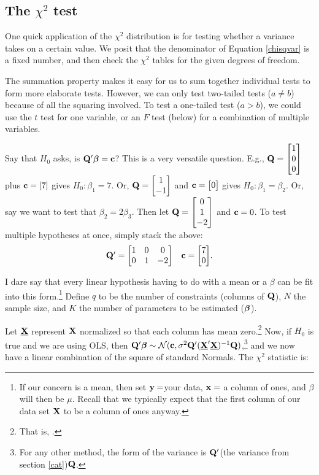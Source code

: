 


\subsection{The $\chi^2$ test}
One quick application of the $\chi^2$ distribution is for testing
whether a variance takes on a certain value. We posit that the
denominator of Equation \ref{chisqvar} is a fixed number, and then check
the $\chi^2$ tables for the given degrees of freedom.

The summation property makes it easy for us to sum together individual
tests to form more elaborate tests. However, we can only test two-tailed
tests ($a \neq b$) because of all the squaring involved. To test a
one-tailed test ($a > b$), we could use the $t$ test for one variable,
or an $F$ test (below) for a combination of multiple variables.

Say that $H_0$ asks, is ${{\bf Q}'
{\mbox{\boldmath$\beta$}}} = {\bf c}$?  This is a very versatile question. E.g., ${\bf Q} =
\left[\begin{matrix}1\cr 0\cr 0\end{matrix}\right]$ plus ${\bf c} = [7]$ gives $H_0: \beta_1 = 7$. Or, ${\bf Q} = \left[\begin{matrix}1 \cr
-1\end{matrix}\right]$ and ${\bf c} = \left[\begin{matrix}0\end{matrix}\right]$ gives $H_0: \beta_1=\beta_2$. 
Or, say we want to test that $\beta_2 = 2\beta_3$. Then let ${\bf Q}=\left[\begin{matrix}0 \cr 1 \cr -2\end{matrix}\right]$ and ${\bf c} = 0$.
To test multiple hypotheses at once, simply stack the above:
\begin{equation}
\begin{matrix}{\bf Q}' = \left[\begin{matrix}1 & 0 & 0  \cr
                0 &1 &-2\end{matrix}\right] 
                & {\bf c} = \left[\begin{matrix}7 \cr 0\end{matrix}\right]\end{matrix}.\label{qc}\end{equation}

I dare
say that every linear hypothesis having to do with a mean or a $\beta$ can be
fit into this form.\footnote{If our concern is a mean, then set
${\bf y}=$your data, ${\bf x}=$ a column of ones, and $\beta$ will then be
$\mu$. Recall that we typically expect that the first column of our data
set ${\bf X}$ to
be a column of ones anyway.}
Define $q$ to be the number of constraints (columns
of ${\bf Q}$), $N$ the sample size, and $K$ the number of parameters to be
estimated (${\mbox{\boldmath$\beta$}}$).

Let $\underbar{\bf X}$ represent ${\bf X}$ normalized so that each column has mean
zero.\footnote{That is, .}
Now, if $H_0$ is true and we are using OLS, then ${\bf Q}' {\mbox{\boldmath$\beta$}} \sim {\cal
N}({\bf c}, \sigma^2 {\bf Q}' (\underbar{\bf X}'\underbar{\bf X})^{-1} {\bf Q})$,\footnote{For any other
method, the form of the variance is ${\bf Q}'$(the variance from section
\ref{cat})${\bf Q}$.} and we now have a linear combination of the square of
standard Normals. The $\chi^2$ statistic is:

